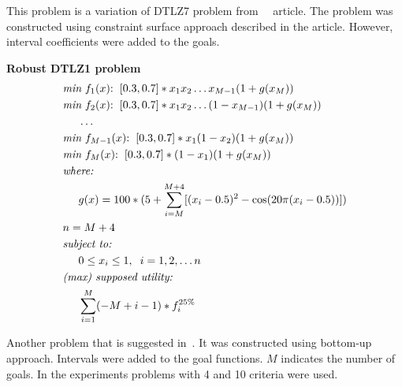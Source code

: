 \begin{description}
    This problem is a variation of DTLZ7 problem from~~\cite{DTL+02}
    article. The problem was constructed using constraint surface approach
    described in the article. However, interval coefficients were added to the
    goals.


  \item{\textbf{Robust DTLZ1 problem}}
    \begin{align*}
      & \textit{min}\text{ $f_1(x)$:} \hspace{0.2cm}
      [0.3, 0.7] * x_1 x_2 \dots x_{M-1}(1 + g(x_M)) \\
      & \textit{min}\text{ $f_2(x)$:} \hspace{0.2cm}
      [0.3, 0.7] * x_1 x_2 \dots (1 - x_{M-1})(1 + g(x_M)) \\
      & \hspace{0.5cm} \dots \\
      & \textit{min}\text{ $f_{M-1}(x)$:} \hspace{0.2cm}
      [0.3, 0.7] * x_1 (1 - x_2) (1 + g(x_M)) \\
      & \textit{min}\text{ $f_M(x)$:} \hspace{0.2cm}
      [0.3, 0.7] * (1 - x_1) (1 + g(x_M)) \\
      & \textit{where:} \\ 
      & \hspace{0.5cm} g(x) = 100 * (5 + \sum_{i=M}^{M+4}
        [ (x_i - 0.5)^2 - \text{cos}(20 \pi (x_i -0.5)) ])\\
      & n = M + 4 \\
      & \textit{subject to:} \\  
      & \hspace{0.5cm} 0 \le x_i \le 1, \hspace{0.2cm} i = 1, 2, \dots n \\
      & \textit{(max) supposed utility:} \\
      & \hspace{0.5cm} \sum_{i=1}^M (-M+i-1) * f_i^{25\%} 
    \end{align*}

    Another problem that is suggested in~\cite{DTL+02}. It was constructed
    using bottom-up approach. Intervals were added to the goal functions. $M$
    indicates the number of goals. In the experiments problems with 4 and 10
    criteria were used.

\end{description}



